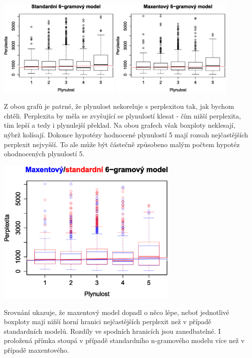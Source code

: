 \documentclass[12pt,a4paper]{report}
\begin{document}
\begin{center}
	\includegraphics[width=60mm]{./grafy/morf/ngram/text.svg.eps}
	\includegraphics[width=60mm]{./grafy/morf/maxent/text.svg.eps}
\end{center}
Z obou grafů je patrné, že plynulost nekoreluje s perplexitou tak, jak bychom chtěli. Perplexita by měla se zvyšující se plynulostí klesat - čím nižší perplexita, tím lepší a tedy i plynulejší překlad. Na obou grafech však boxploty neklesají, nýbrž kolísají. Dokonce hypotézy hodnocené plynulostí 5 mají rozsah nejčastějších perplexit nejvyšší. To ale může být částečně způsobeno malým počtem hypotéz ohodnocených plynulostí 5.

\begin{center}
	\includegraphics[width=90mm]{./grafy/morf/porovnani/text.svg.eps}
\end{center}
Srovnání ukazuje, že maxentový model dopadl o něco lépe, neboť jednotlivé boxploty mají nižší horní hranici nejčastějších perplexit než v případě standardních modelů. Rozdíly ve spodních hranicích jsou zanedbatelné. I proložená přímka stoupá v případě standardního n-gramového modelu více než v případě maxentového.
\end{document}
